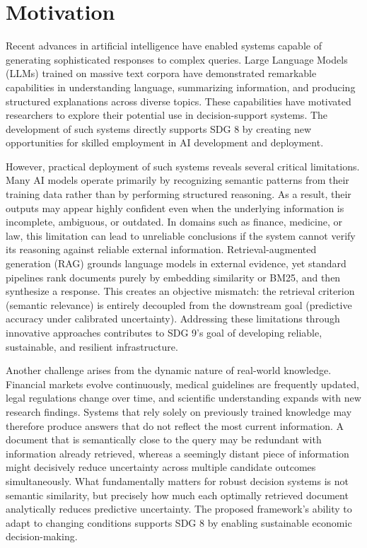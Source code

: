 \documentclass[12pt,a4paper,oneside]{report}
\theoremstyle{definition}
\theoremstyle{remark}
\begin{document}
\section{Motivation}

Recent advances in artificial intelligence have enabled systems capable of generating sophisticated responses to complex queries. Large Language Models (LLMs) trained on massive text corpora have demonstrated remarkable capabilities in understanding language, summarizing information, and producing structured explanations across diverse topics. These capabilities have motivated researchers to explore their potential use in decision-support systems. The development of such systems directly supports SDG 8 by creating new opportunities for skilled employment in AI development and deployment.

However, practical deployment of such systems reveals several critical limitations. Many AI models operate primarily by recognizing semantic patterns from their training data rather than by performing structured reasoning. As a result, their outputs may appear highly confident even when the underlying information is incomplete, ambiguous, or outdated. In domains such as finance, medicine, or law, this limitation can lead to unreliable conclusions if the system cannot verify its reasoning against reliable external information. Retrieval-augmented generation (RAG) grounds language models in external evidence, yet standard pipelines rank documents purely by embedding similarity or BM25, and then synthesize a response. This creates an objective mismatch: the retrieval criterion (semantic relevance) is entirely decoupled from the downstream goal (predictive accuracy under calibrated uncertainty). Addressing these limitations through innovative approaches contributes to SDG 9's goal of developing reliable, sustainable, and resilient infrastructure.

Another challenge arises from the dynamic nature of real-world knowledge. Financial markets evolve continuously, medical guidelines are frequently updated, legal regulations change over time, and scientific understanding expands with new research findings. Systems that rely solely on previously trained knowledge may therefore produce answers that do not reflect the most current information. A document that is semantically close to the query may be redundant with information already retrieved, whereas a seemingly distant piece of information might decisively reduce uncertainty across multiple candidate outcomes simultaneously. What fundamentally matters for robust decision systems is not semantic similarity, but precisely how much each optimally retrieved document analytically reduces predictive uncertainty. The proposed framework's ability to adapt to changing conditions supports SDG 8 by enabling sustainable economic decision-making.
\end{document}
